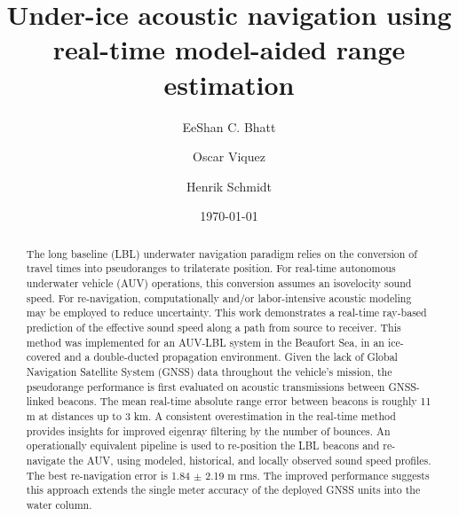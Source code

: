 \documentclass[preprint,TurnOnLineNumbers]{JASA}
\newcommand{\llabel}[1]{\hypertarget{llineno:#1}{\linelabel{#1}}}
\begin{document}
\title[JASA/draft]{Under-ice acoustic navigation using real-time model-aided range estimation}
\author{EeShan C. Bhatt}
\author{Oscar Viquez}
\author{Henrik Schmidt}


\date{\today}

\begin{abstract}
The long baseline (LBL) underwater navigation paradigm relies on the conversion of travel times into pseudoranges to trilaterate position. 
For real-time autonomous underwater vehicle (AUV) operations, this conversion assumes an isovelocity sound speed.
For re-navigation, computationally and/or labor-intensive acoustic modeling may be employed to reduce uncertainty.
This work demonstrates a real-time ray-based prediction of the effective sound speed along a path from source to receiver.
\llabel{2.1} This method was implemented for an AUV-LBL system in the Beaufort Sea, in an ice-covered and a double-ducted propagation environment.
\llabel{2.2} Given the lack of Global Navigation Satellite System (GNSS) data throughout the vehicle's mission, the pseudorange performance is first evaluated on acoustic transmissions between GNSS-linked beacons.
The mean real-time absolute range error between beacons is roughly 11 m at distances up to 3 km.
A consistent overestimation in the real-time method provides insights for improved eigenray filtering by the number of bounces.
An operationally equivalent pipeline is used to re-position the LBL beacons and re-navigate the AUV, using modeled, historical, and locally observed sound speed profiles.
The best re-navigation error is 1.84 $\pm$ 2.19 m rms.
\llabel{2.3} The improved performance suggests this approach extends the single meter accuracy of the deployed GNSS units into the water column.
\end{abstract}


\maketitle
\end{document}
